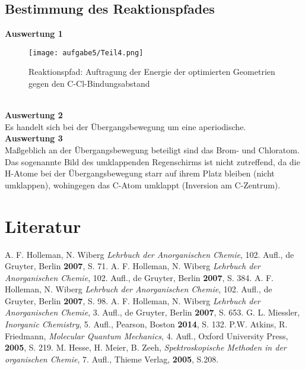 \documentclass[12pt]{article}
\begin{document}
\begin{onehalfspace}
\subsection{Bestimmung des Reaktionspfades}
\textbf{Auswertung 1}
\begin{figure}[!htpb]
\centering
  \texttt{[image: aufgabe5/Teil4.png]}%
      \captionsetup{justification=raggedright}
  \caption{Reaktionspfad: Auftragung der Energie der optimierten Geometrien gegen den C-Cl-Bindungsabstand}
\end{figure}\\
\noindent
\textbf{Auswertung 2}\\
Es handelt sich bei der Übergangsbewegung um eine aperiodische. \\
\noindent
\textbf{Auswertung 3}\\
Maßgeblich an der Übergangsbewegung beteiligt sind das Brom- und Chloratom. 
 Das sogenannte Bild des \glqq umklappenden Regenschirms \grqq ist nicht zutreffend, da die H-Atome bei der Übergangsbewegung starr auf ihrem Platz bleiben (nicht umklappen), wohingegen das C-Atom umklappt (Inversion am C-Zentrum). 
\section{Literatur}
\renewcommand{\section}[2]{}%
\begin{thebibliography}{}
A. F. Holleman, N. Wiberg \textit{Lehrbuch der Anorganischen Chemie}, 102. Aufl., de Gruyter, Berlin \textbf{2007}, S. 71.
A. F. Holleman, N. Wiberg \textit{Lehrbuch der Anorganischen Chemie}, 102. Aufl., de Gruyter, Berlin \textbf{2007}, S. 384.
A. F. Holleman, N. Wiberg \textit{Lehrbuch der Anorganischen Chemie}, 102. Aufl., de Gruyter, Berlin \textbf{2007}, S. 98.
A. F. Holleman, N. Wiberg \textit{Lehrbuch der Anorganischen Chemie}, 3. Aufl., de Gruyter, Berlin \textbf{2007}, S. 653.
G. L. Miessler, \textit{Inorganic Chemistry}, 5. Aufl., Pearson, Boston \textbf{2014}, S. 132.
P.W. Atkins, R. Friedmann, \textit{Molecular Quantum Mechanics}, 4. Aufl., Oxford University Press, \textbf{2005}, S. 219.
 M. Hesse, H. Meier, B. Zeeh, \textit{Spektroskopische Methoden in der organischen Chemie}, 7.
Aufl., Thieme Verlag, \textbf{2005}, S.208.
\end{thebibliography}
\end{onehalfspace}
\end{document}
